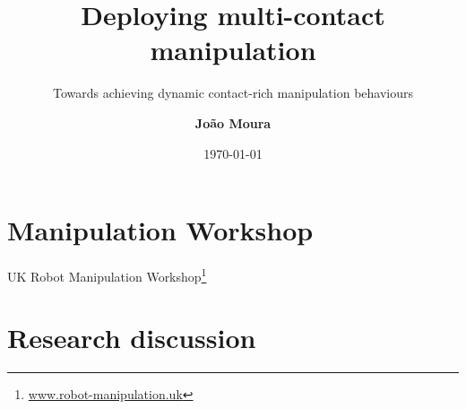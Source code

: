 \documentclass[aspectratio=169]{beamer}
\title{Deploying multi-contact manipulation}
\subtitle{Towards achieving dynamic contact-rich manipulation behaviours}
\author{\textbf{Jo\~{a}o Moura}}
\date{\today}
\begin{document}


\begin{frame}
  \maketitle
\end{frame}


\section{Manipulation Workshop}

\begin{frame}{UK Robot Manipulation Workshop\footnote{\href{https://www.robot-manipulation.uk}{www.robot-manipulation.uk}}}
  \begin{center}
    \begin{figure}
    \end{figure}
  \end{center}
\end{frame}

\section{Research discussion}
\end{document}
